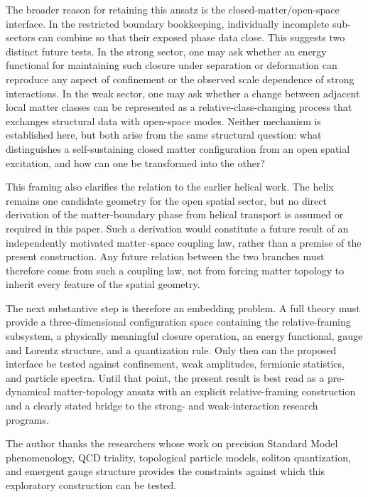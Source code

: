 \documentclass[aps,prd,reprint,superscriptaddress,nofootinbib,longbibliography,floatfix]{revtex4-2}
\begin{document}
The broader reason for retaining this ansatz is the closed-matter/open-space interface. In the restricted boundary bookkeeping, individually incomplete sub-sectors can combine so that their exposed phase data close. This suggests two distinct future tests. In the strong sector, one may ask whether an energy functional for maintaining such closure under separation or deformation can reproduce any aspect of confinement or the observed scale dependence of strong interactions. In the weak sector, one may ask whether a change between adjacent local matter classes can be represented as a relative-class-changing process that exchanges structural data with open-space modes. Neither mechanism is established here, but both arise from the same structural question: what distinguishes a self-sustaining closed matter configuration from an open spatial excitation, and how can one be transformed into the other?

This framing also clarifies the relation to the earlier helical work. The helix remains one candidate geometry for the open spatial sector, but no direct derivation of the matter-boundary phase from helical transport is assumed or required in this paper. Such a derivation would constitute a future result of an independently motivated matter--space coupling law, rather than a premise of the present construction. Any future relation between the two branches must therefore come from such a coupling law, not from forcing matter topology to inherit every feature of the spatial geometry.

The next substantive step is therefore an embedding problem. A full theory must provide a three-dimensional configuration space containing the relative-framing subsystem, a physically meaningful closure operation, an energy functional, gauge and Lorentz structure, and a quantization rule. Only then can the proposed interface be tested against confinement, weak amplitudes, fermionic statistics, and particle spectra. Until that point, the present result is best read as a pre-dynamical matter-topology ansatz with an explicit relative-framing construction and a clearly stated bridge to the strong- and weak-interaction research programs.
\begin{acknowledgments}
The author thanks the researchers whose work on precision Standard Model phenomenology, QCD triality, topological particle models, soliton quantization, and emergent gauge structure provides the constraints against which this exploratory construction can be tested.
\end{acknowledgments}
\end{document}
